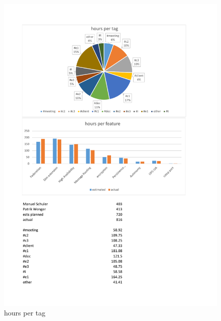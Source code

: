 \begin{figure}[]
	\includegraphics[trim=4cm 2cm 3.5cm 2.8cm, clip=true, width=\textwidth]{img/project_monitoring_diagrams.pdf}
	\caption{hours per tag}
	\label{fig:hours:per:tag}
\end{figure}



